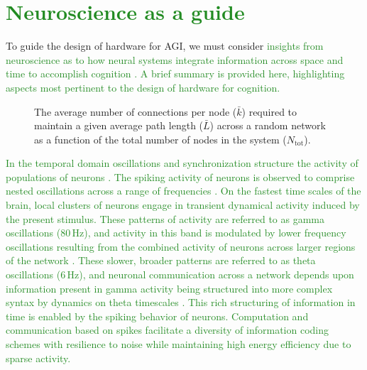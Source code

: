 \documentclass[twocolumn]{article}
\begin{document}
\section{\label{sec:neuroscience}\textcolor{ForestGreen}{Neuroscience as a guide}}
To guide the design of hardware for AGI, we must consider \textcolor{ForestGreen}{insights from neuroscience as to how neural systems integrate information across space and time to accomplish cognition \cite{bu2006,sp2010,beba2017,khma2018}. A brief summary is provided here, highlighting aspects most pertinent to the design of hardware for cognition.} 

\begin{figure}[t]
	\caption{\label{fig:path_length}The average number of connections per node ($\bar{k}$) required to maintain a given average path length ($\bar{L}$)  across a random network as a function of the total number of nodes in the system ($N_{\mathrm{tot}}$).}
\end{figure}
\textcolor{ForestGreen}{In the temporal domain oscillations and synchronization structure the activity of populations of neurons \cite{bu2006}. The spiking activity of neurons is observed to comprise nested oscillations across a range of frequencies \cite{budr2004}. On the fastest time scales of the brain, local clusters of neurons engage in transient dynamical activity induced by the present stimulus. These patterns of activity are referred to as gamma oscillations (80\,Hz), and activity in this band is modulated by lower frequency oscillations \cite{caed2006,jeco2007} resulting from the combined activity of neurons across larger regions of the network \cite{stsa2000}. These slower, broader patterns are referred to as theta oscillations (6\,Hz), and neuronal communication across a network depends upon information present in gamma activity being structured into more complex syntax by dynamics on theta timescales \cite{fr2015,bu2019}. This rich structuring of information in time is enabled by the spiking behavior of neurons. Computation and communication based on spikes facilitate a diversity of information coding schemes with resilience to noise while maintaining high energy efficiency due to sparse activity.}
\end{document}
